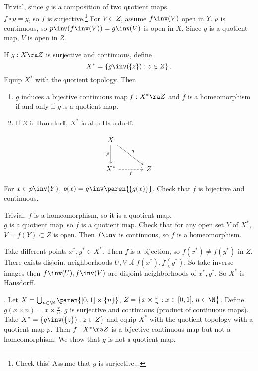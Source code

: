  \note{\mimp} Trivial, since \(g\) is a composition of two quotient maps. \\
\note{\mimpd} \(f \circ p = g\), so \(f\) is surjective.\footnote{Check this! Assume that \(g\) is surjective...} For \(V \subset Z\), assume \(f\inv(V)\) open in \(Y\). \(p\) is continuous, so \(p\inv(f\inv(V)) = g\inv(V)\) is open in \(X\). Since \(g\) is a quotient map, \(V\) is open in \(Z\).

\pagebreak

 If \(g : X \ra Z\) is surjective and continuous, define
\[
    X^* = \left\{g\inv(\{z\}) : z \in Z \right\}.
\]
Equip \(X^*\) with the quotient topology. Then
\begin{enumerate}
    \item \(g\) induces a bijective continuous map \(f : X^* \ra Z\) and \(f\) is a homeomorphism if and only if \(g\) is a quotient map.
    \item If \(Z\) is Hausdorff, \(X^*\) is also Hausdorff.
\end{enumerate}
\[
    \begin{tikzcd}[row sep = large, column sep = large]
        X \arrow[dr, "g"] \arrow[d, "p"'] & ~ \\
        X^* \arrow[r, dashed, "f"'] & Z
    \end{tikzcd}
\]

\pf For \(x \in p\inv(Y)\), \(p(x) = g\inv\paren{\{g(x)\}}\). Check that \(f\) is bijective and continuous.

 \note{\mimp} Trivial. \(f\) is a homeomorphism, so it is a quotient map. \\
\note{\mimpd} \(g\) is a quotient map, so \(f\) is a quotient map. Check that for any open set \(Y\) of \(X^*\), \(V = f(Y) \subset Z\) is open. Then \(f\inv\) is continuous, so \(f\) is a homeomorphism.

 Take different points \(x^*, y^* \in X^*\). Then \(f\) is a bijection, so \(f(x^*) \neq f(y^*)\) in \(Z\). There exists disjoint neighborhoods \(U, V\) of \(f(x^*), f(y^*)\). So take inverse images then \(f\inv(U), f\inv(V)\) are disjoint neighborhoods of \(x^*, y^*\). So \(X^*\) is Hausdorff.

\ex. Let \(X = \bigcup_{n \in \N} \paren{[0, 1] \times \{n\}}\), \(Z = \left\{x \times \frac{x}{n} : x \in [0, 1],\, n \in \N\right\}\). Define \(g(x\times n) = x \times \frac{x}{n}\). \(g\) is surjective and continuous (product of continuous maps). Take \(X^* = \{g\inv(\{z\}) : z \in Z\}\) and equip \(X^*\) with the quotient topology with a quotient map \(p\). Then \(f: X^* \ra Z\) is a bijective continuous map but not a homeomorphism. We show that \(g\) is not a quotient map.


